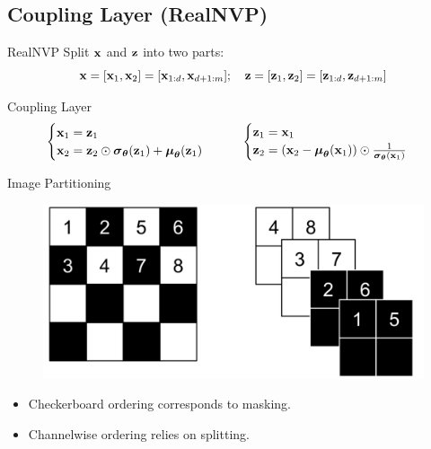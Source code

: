 \documentclass{beamer}
\begin{document}
\subsection{Coupling Layer (RealNVP)}
\begin{frame}{RealNVP}
	\vspace{-0.5cm}
	Split $\mathbf{x}$ and $\mathbf{z}$ into two parts: 
	\[
		\mathbf{x} = [\mathbf{x}_1, \mathbf{x}_2] = [\mathbf{x}_{1:d}, \mathbf{x}_{d+1:m}]; \quad \mathbf{z} = [\mathbf{z}_1, \mathbf{z}_2] = [\mathbf{z}_{1:d}, \mathbf{z}_{d+1:m}]
	\]
	\vspace{-0.7cm}
	\begin{block}{Coupling Layer}
		\vspace{-0.7cm}
		\[
			\begin{cases} \mathbf{x}_1 = \mathbf{z}_1 \\ \mathbf{x}_2 = \mathbf{z}_2 \odot \boldsymbol{\sigma}_{\boldsymbol{\theta}}(\mathbf{z}_1) + \boldsymbol{\mu}_{\boldsymbol{\theta}}(\mathbf{z}_1) \end{cases}
			\qquad
			\begin{cases} \mathbf{z}_1 = \mathbf{x}_1 \\ \mathbf{z}_2 = (\mathbf{x}_2 - \boldsymbol{\mu}_{\boldsymbol{\theta}}(\mathbf{x}_1)) \odot \frac{1}{\boldsymbol{\sigma}_{\boldsymbol{\theta}}(\mathbf{x}_1)} \end{cases}
		\]
	\end{block}
	\vspace{-0.5cm}
	\begin{block}{Image Partitioning}
		
		\begin{minipage}[t]{0.5\columnwidth}
			\begin{figure}
				\centering
				\includegraphics[width=\linewidth]{figs/realnvp_masking.png}
			\end{figure}
		\end{minipage}%
		\begin{minipage}[t]{0.5\columnwidth}
			\begin{itemize}
				\item Checkerboard ordering corresponds to masking.
				\item Channelwise ordering relies on splitting.
			\end{itemize}
		\end{minipage}
	\end{block}
	\vspace{-0.5cm}
\end{frame}
\end{document}
